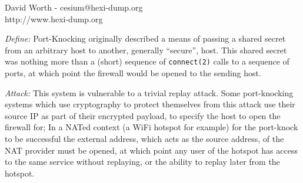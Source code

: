 \documentclass[landscape,twocolumn]{foils}
\begin{document}
\LogoOff %




David Worth - cesium@hexi-dump.org\\
http://www.hexi-dump.org


\LogoOn
\raggedright
\small

\emph{Define:} Port-Knocking originally described a means of passing a shared secret from an arbitrary host to another, generally ``secure'', host.  This shared secret was nothing more than a (short) sequence of \texttt{connect(2)} calls to a sequence of ports, at which point the firewall would be opened to the sending host.


\raggedright
\emph{Attack:} This system is vulnerable to a trivial replay attack.  Some port-knocking systems which use cryptography to protect themselves from this attack use their source IP as part of their encrypted payload, to specify the host to open the firewall for;  In a NATed context (a WiFi hotspot for example) for the port-knock to be successful the external address, which acts as the source address, of the NAT provider must be opened, at which point any user of the hotspot has access to the same service without replaying, or the ability to replay later from the hotspot.
\end{document}
